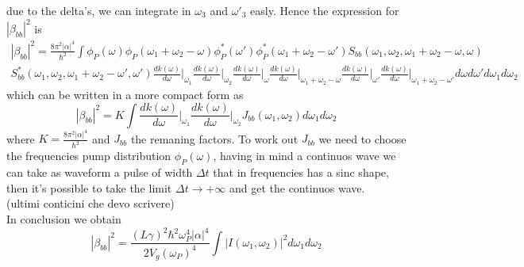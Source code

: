 due to the delta's, we can integrate in $\omega_3$ and $\omega'_3$ easly. Hence the expression for $|\beta_{bb}|^2$ is
\begin{multline}|\beta_{bb}|^2 = \frac{8\pi^2|\alpha|^4}{\hbar^2}\int \phi_P(\omega)\phi_P(\omega_1+\omega_2-\omega)\phi_P^*(\omega')\phi^*_P(\omega_1+\omega_2-\omega')S_{bb}(\omega_1,\omega_2,\omega_1+\omega_2-\omega,\omega)\\ S^*_{bb}(\omega_1,\omega_2,\omega_1+\omega_2-\omega',\omega')
\frac{dk(\omega)}{d\omega}\Bigg|_{\omega_1}\frac{dk(\omega)}{d\omega}\Bigg|_{\omega_2}\frac{dk(\omega)}{d\omega}\Bigg|_{\omega}\frac{dk(\omega)}{d\omega}\Bigg|_{\omega_1+\omega_2-\omega}\frac{dk(\omega)}{d\omega}\Bigg|_{\omega'}\frac{dk(\omega)}{d\omega}\Bigg|_{\omega_1+\omega_2-\omega'} d\omega d\omega'  d\omega_1d\omega_2\end{multline}
which can be written in a more compact form as
\[|\beta_{bb}|^2 = K\int \frac{dk(\omega)}{d\omega}\Bigg|_{\omega_1}\frac{dk(\omega)}{d\omega}\Bigg|_{\omega_2} J_{bb}(\omega_1,\omega_2)d\omega_1 d\omega_2\]
where $K = \frac{8\pi^2|\alpha|^4}{\hbar^2}$ and $J_{bb}$ the remaning factors. To work out $J_{bb}$ we need to choose the frequencies pump distribution $\phi_{P}(\omega)$, having in mind a continuos wave we can take as waveform a pulse of width $\Delta t$ that in frequencies has a sinc shape, then it's possible to take the limit $\Delta t \to +\infty$ and get the continuos wave.\\(ultimi conticini che devo scrivere)\\
In conclusion we obtain
\[|\beta_{bb}|^2 = \frac{(L\gamma)^2\hbar^2\omega_{P}^4 |\alpha|^4}{2V_g(\omega_P)^4}\int |I(\omega_1,\omega_2)|^2d\omega_1 d\omega_2\]